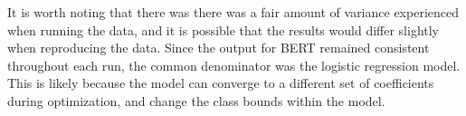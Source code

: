 \documentclass{l4proj}
\begin{document}
It is worth noting that there was there was a fair amount of variance experienced when running the data, and it is possible that the results would differ slightly when reproducing the data. Since the output for BERT remained consistent throughout each run, the common denominator was the logistic regression model. This is likely because the model can converge to a different set of coefficients during optimization, and change the class bounds within the model.

\end{document}
